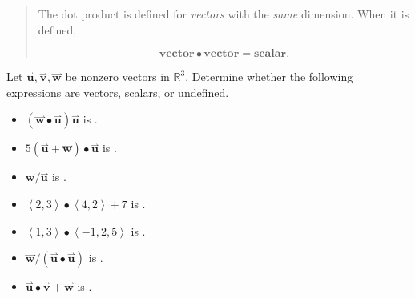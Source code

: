 \documentclass{ximera}
\begin{document}
\begin{quote}
The dot product is defined for \emph{vectors} with the \emph{same} dimension.  When it is defined, 

\[
 \mathbf{vector} \bullet \mathbf{vector} = \mathbf{scalar}.
\]
\end{quote}

\begin{question}
  Let $\overset{\boldsymbol{\rightharpoonup}}{\mathbf{u}},\overset{\boldsymbol{\rightharpoonup}}{\mathbf{v}},\overset{\boldsymbol{\rightharpoonup}}{\mathbf{w}}$ be nonzero vectors in $\mathbb{R}^3$.  Determine whether the following expressions are vectors, scalars, or undefined.
  
\begin{itemize} 
\item $(\overset{\boldsymbol{\rightharpoonup}}{\mathbf{w}} \bullet \overset{\boldsymbol{\rightharpoonup}}{\mathbf{u}} ) \overset{\boldsymbol{\rightharpoonup}}{\mathbf{u}}$ is .
\item $5(\overset{\boldsymbol{\rightharpoonup}}{\mathbf{u}} +\overset{\boldsymbol{\rightharpoonup}}{\mathbf{w}}) \bullet {\overset{\boldsymbol{\rightharpoonup}}{\mathbf{u}}}$ is .
\item $\overset{\boldsymbol{\rightharpoonup}}{\mathbf{w}} / \overset{\boldsymbol{\rightharpoonup}}{\mathbf{u}}$ is .
\item $\left< 2,3 \right> \bullet \left< 4,2 \right> + 7$ is .
\item $\left< 1,3 \right> \bullet \left< -1,2,5 \right>$ is .
\item $\overset{\boldsymbol{\rightharpoonup}}{\mathbf{w}} / ( \overset{\boldsymbol{\rightharpoonup}}{\mathbf{u}} \bullet \overset{\boldsymbol{\rightharpoonup}}{\mathbf{u}})$ is .
\item $\overset{\boldsymbol{\rightharpoonup}}{\mathbf{u}}\bullet \overset{\boldsymbol{\rightharpoonup}}{\mathbf{v}}+\overset{\boldsymbol{\rightharpoonup}}{\mathbf{w}}$ is .
\end{itemize}
\end{question}
 
\end{document}
